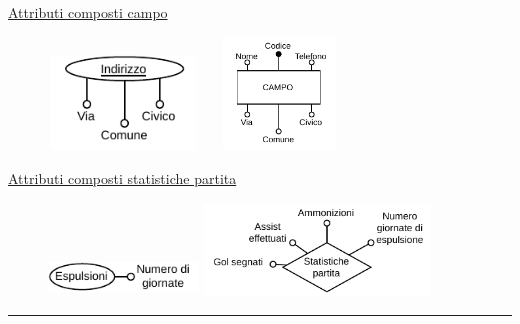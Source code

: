 \documentclass[11pt, openany]{article}
\theoremstyle{definition}
\theoremstyle{plain}
\theoremstyle{remark}
\begin{document}
				\underline{Attributi composti campo}
				\begin{figure}[h]
					\begin{minipage}[b]{8.5cm}
						\centering
						\includegraphics[width=4cm, height=2.5cm]{./include/bdsi-prog-2023-TRAD.C3.pdf}
					\end{minipage}
					\hspace{2mm} \hspace{3mm}
					\begin{minipage}[b]{8.5cm}
						\centering
						\includegraphics[width=4cm, height=3cm]{./include/bdsi-prog-2023-TRAD.L3.pdf}
					\end{minipage}
				\end{figure}
				
				\underline{Attributi composti statistiche partita}
				\begin{figure}[h!]
					\begin{minipage}[b]{8.5cm}
						\centering
						\includegraphics[width=4cm, height=1cm]{./include/bdsi-prog-2023-TRAD.C4.pdf}
					\end{minipage}
					\hspace{2mm} \hspace{3mm}
					\begin{minipage}[b]{8.5cm}
						\centering
						\includegraphics[width=6cm, height=2.5cm]{./include/bdsi-prog-2023-TRAD.L4.pdf}
					\end{minipage}
				\end{figure}
				

				
	

	\newpage
	\hrule
	\tableofcontents
	
\end{document}
